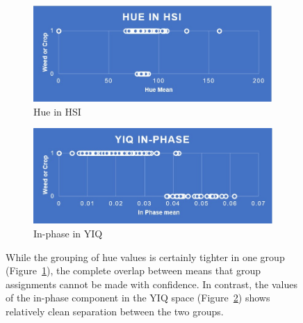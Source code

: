 \documentclass[letterpaper]{report}
\begin{document}
\begin{figure}[H]
	\begin{subfigure}[h]{0.48\linewidth}
		\includegraphics[width=1\linewidth]{./figures/hsi-hue.jpg}
		\caption{Hue in HSI}
		\label{subfig:hue}	
	\end{subfigure}
	\hfill
	\begin{subfigure}[h]{0.48\linewidth}
		\includegraphics[width=1\linewidth]{./figures/yiq-in-phase.jpg}
		\caption{In-phase in YIQ}
		\label{subfig:in_phase}		
	\end{subfigure}%
	\caption[Prediction using hue in HSI and In-phase in YIQ]{While the grouping of hue values is certainly tighter in one group (Figure~\ref{subfig:hue}), the complete overlap between means that group assignments cannot be made with confidence. In contrast, the values of the in-phase component in the YIQ space (Figure~\ref{subfig:in_phase}) shows relatively clean separation between the two groups.}
	\label{fig:hue_vs_inphase}
\end{figure}
\end{document}
